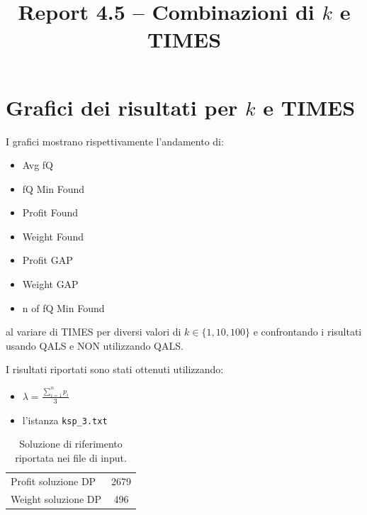 \documentclass[a4paper,12pt]{article}
\title{Report 4.5 -- Combinazioni di $k$ e TIMES}
\begin{document}
\maketitle

\newpage

\section{Grafici dei risultati per $k$ e TIMES}

I grafici mostrano rispettivamente l'andamento di:
\begin{itemize}
    \item Avg fQ
    \item fQ Min Found
    \item Profit Found
    \item Weight Found
    \item Profit GAP
    \item Weight GAP
    \item n of fQ Min Found
\end{itemize}
al variare di TIMES per diversi valori di $k \in \{1,10,100\}$ e confrontando
i risultati usando QALS e NON utilizzando QALS.

I risultati riportati sono stati ottenuti utilizzando:

\begin{itemize}
   \item $\lambda = \frac{\sum_{i=1}^{n} p_i}{3}$
    \item l'istanza \texttt{ksp\_3.txt}
\end{itemize}

\begin{table}[H]
\centering
\begin{tabular}{lc}
\hline
Profit soluzione DP & 2679 \\
Weight soluzione DP & 496 \\
\hline
\end{tabular}
\caption{Soluzione di riferimento riportata nei file di input.}
\label{tab:knapsack-solution}
\end{table}
\end{document}
